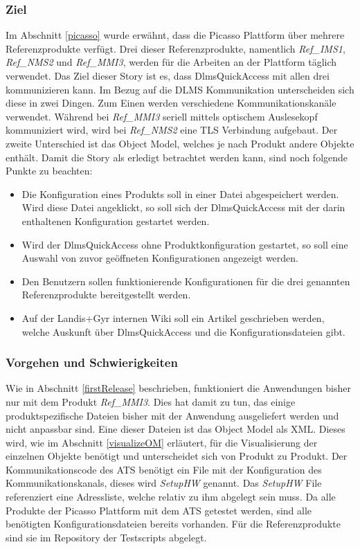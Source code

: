 \subsubsection{Ziel}
Im Abschnitt \ref{picasso} wurde erwähnt, dass die Picasso Plattform über mehrere Referenzprodukte verfügt.
Drei dieser Referenzprodukte, namentlich \textit{Ref\_IMS1}, \textit{Ref\_NMS2} und \textit{Ref\_MMI3}, werden für die Arbeiten an der Plattform täglich verwendet.
Das Ziel dieser Story ist es, dass DlmsQuickAccess mit allen drei kommunizieren kann.
Im Bezug auf die \ac{DLMS} Kommunikation unterscheiden sich diese in zwei Dingen.
Zum Einen werden verschiedene Kommunikationskanäle verwendet. 
Während bei \textit{Ref\_MMI3} seriell mittels optischem Auslesekopf kommuniziert wird, wird bei \textit{Ref\_NMS2} eine \ac{TLS} Verbindung aufgebaut.
Der zweite Unterschied ist das Object Model, welches je nach Produkt andere Objekte enthält.
Damit die Story als erledigt betrachtet werden kann, sind noch folgende Punkte zu beachten:
\begin{itemize}
   \item Die Konfiguration eines Produkts soll in einer Datei abgespeichert werden. Wird diese Datei angeklickt, so soll sich der DlmsQuickAccess mit der darin enthaltenen Konfiguration gestartet werden.
   \item Wird der DlmsQuickAccess ohne Produktkonfiguration gestartet, so soll eine Auswahl von zuvor geöffneten Konfigurationen angezeigt werden.
   \item Den Benutzern sollen funktionierende Konfigurationen für die drei genannten Referenzprodukte bereitgestellt werden.
   \item Auf der Landis+Gyr internen Wiki soll ein Artikel geschrieben werden, welche Auskunft über DlmsQuickAccess und die Konfigurationsdateien gibt.
\end{itemize}

\subsubsection{Vorgehen und Schwierigkeiten}\label{s3configvorgehen}
Wie in Abschnitt \ref{firstRelease} beschrieben, funktioniert die Anwendungen bisher nur mit dem Produkt \textit{Ref\_MMI3}.
Dies hat damit zu tun, das einige produktspezifische Dateien bisher mit der Anwendung ausgeliefert werden und nicht anpassbar sind.
Eine dieser Dateien ist das Object Model als XML. 
Dieses wird, wie im Abschnitt \ref{visualizeOM} erläutert, für die Visualisierung der einzelnen Objekte benötigt und unterscheidet sich von Produkt zu Produkt.
Der Kommunikationscode des \ac{ATS} benötigt ein File mit der Konfiguration des Kommunikationskanals, dieses wird \textit{SetupHW} genannt.
Das \textit{SetupHW} File referenziert eine Adressliste, welche relativ zu ihm abgelegt sein muss.
Da alle Produkte der Picasso Plattform mit dem \ac{ATS} getestet werden, sind alle benötigten Konfigurationsdateien bereits vorhanden.
Für die Referenzprodukte sind sie im Repository der Testscripts abgelegt.

